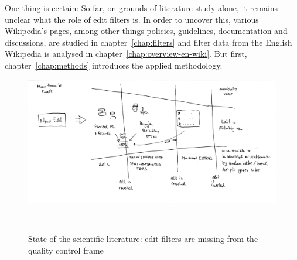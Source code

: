 One thing is certain: So far, on grounds of literature study alone, it remains unclear what the role of edit filters is.
In order to uncover this, various Wikipedia's pages, among other things policies, guidelines, documentation and discussions, are studied in chapter~\ref{chap:filters} and filter data from the English Wikipedia is analysed in chapter~\ref{chap:overview-en-wiki}.
But first, chapter~\ref{chap:methods} introduces the applied methodology.

\begin{figure}
\centering
  \includegraphics[width=0.9\columnwidth]{pics/funnel-no-filters.png}
  \caption{State of the scientific literature: edit filters are missing from the quality control frame}~\label{fig:funnel-no-filters}
\end{figure}

